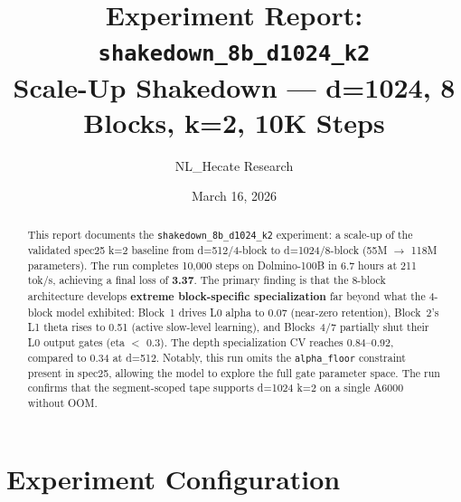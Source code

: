 \documentclass[11pt,a4paper]{article}
\title{Experiment Report: \texttt{shakedown\_8b\_d1024\_k2}\\[0.3em]
\large Scale-Up Shakedown --- d=1024, 8 Blocks, k=2, 10K Steps}
\author{NL\_Hecate Research}
\date{March 16, 2026}
\begin{document}
\maketitle

\begin{abstract}
This report documents the \texttt{shakedown\_8b\_d1024\_k2} experiment: a scale-up of the
validated spec25 k=2 baseline from d=512/4-block to d=1024/8-block (55M $\to$ 118M parameters).
The run completes 10,000 steps on Dolmino-100B in 6.7 hours at 211 tok/s, achieving a final
loss of \textbf{3.37}. The primary finding is that the 8-block architecture develops
\textbf{extreme block-specific specialization} far beyond what the 4-block model exhibited:
Block~1 drives L0 alpha to 0.07 (near-zero retention), Block~2's L1 theta rises to 0.51
(active slow-level learning), and Blocks~4/7 partially shut their L0 output gates (eta $<$ 0.3).
The depth specialization CV reaches 0.84--0.92, compared to 0.34 at d=512. Notably, this run
omits the \texttt{alpha\_floor} constraint present in spec25, allowing the model to explore the
full gate parameter space. The run confirms that the segment-scoped tape supports d=1024 k=2
on a single A6000 without OOM.
\end{abstract}

\tableofcontents
\newpage

\section{Experiment Configuration}
\end{document}
